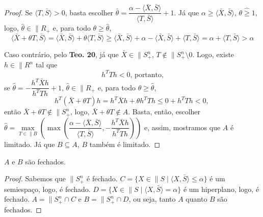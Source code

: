 \begin{homeworkProblemAnswer}
\begin{proof}
Se $\langle T, \bar{S} \rangle > 0$, basta escolher $\bar{\theta} = \dfrac{\alpha - \langle \bar{X}, \bar{S} \rangle}{\langle T, \bar{S} \rangle} + 1$. Já que $\alpha \geq \langle \bar{X}, \bar{S} \rangle$, $\theta \hat{\geq} 1$, logo, $\hat{\theta} \in \|{R}_+$ e, para todo $\theta \geq \hat{\theta}$, 
$$
    \langle \bar{X} + \theta T, \bar{S} \rangle = 
    \langle \bar{X}, \bar{S} \rangle + \theta \langle T, \bar{S} \rangle \geq 
    \langle \bar{X}, \bar{S} \rangle + \alpha - \langle \bar{X}, \bar{S} \rangle + \langle T, \bar{S} \rangle =
    \alpha + \langle T, \bar{S} \rangle >
    \alpha
$$

Caso contrário, pelo \textbf{Teo. 20}, já que $\bar{X} \in \|{S}_{+}^n$, $T \notin \|{S}_+^n \setminus {0}$. Logo, existe $h \in \|{R}^n$ tal que
$$ h^TTh < 0 \text{, portanto,} $$
se $\hat{\theta} = -\dfrac{h^T\bar{X}h}{h^TTh} + 1$, $\hat{\theta} \in \|{R}_+$ e, para todo $\theta \geq \hat{\theta}$,
$$ h^T(\bar{X}+\theta T)h = h^T\bar{X}h + \theta h^TTh \leq 0 + h^TTh < 0 \text{, } $$
então $\bar{X} + \theta T \notin \|{S}_{+}^n$, logo, $\bar{X} + \theta T \notin A$. Basta, então, escolher $\hat{\theta} = \max \limits_{T \in \|{B}}\left(\max\left(\dfrac{\alpha - \langle \bar{X}, \bar{S} \rangle}{\langle T, \bar{S} \rangle}, -\dfrac{h^T\bar{X}h}{h^TTh}\right)\right)$ e, assim, mostramos que $A$ é limitado. Já que $B \subseteq A$, $B$ também é limitado.
\end{proof}

\begin{prop}
$A$ e $B$ são fechados.
\end{prop}
\begin{proof}
Sabemos que $\|{S}_{+}^n$ é fechado. $C = \{X \in \|{S} \mid \langle X, \bar{S} \rangle \leq \alpha\}$ é um semiespaço, logo, é fechado. $D = \{X \in \|{S} \mid \langle X, \bar{S} \rangle = \alpha\}$ é um hiperplano, logo, é fechado. $A = \|{S}_{+}^n \cap C$ e $B = \|{S}_{+}^n \cap D$, ou seja, tanto $A$ quanto $B$ são fechados.
\end{proof}


\end{homeworkProblemAnswer}
